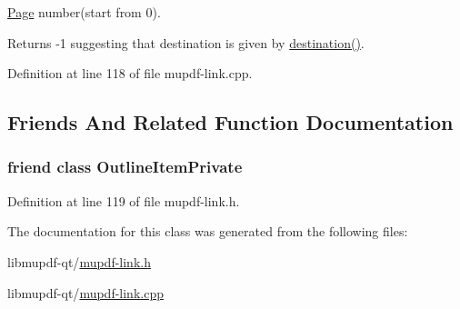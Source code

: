 \hyperlink{class_mu_p_d_f_1_1_page}{Page} number(start from 0). 

\begin{DoxyReturn}{Returns}
-\/1 suggesting that destination is given by \hyperlink{class_mu_p_d_f_1_1_link_goto_r_ab5ff953c35930b5ff57740decee8c61b}{destination()}. 
\end{DoxyReturn}


Definition at line 118 of file mupdf-\/link.\-cpp.



\subsection{Friends And Related Function Documentation}
\hypertarget{class_mu_p_d_f_1_1_link_goto_r_ab008ed670017e41b6e6bba8707c775d2}{
\subsubsection[{Outline\-Item\-Private}]{\setlength{\rightskip}{0pt plus 5cm}friend class Outline\-Item\-Private\hspace{0.3cm}{\ttfamily [friend]}}}\label{class_mu_p_d_f_1_1_link_goto_r_ab008ed670017e41b6e6bba8707c775d2}


Definition at line 119 of file mupdf-\/link.\-h.



The documentation for this class was generated from the following files\-:\begin{DoxyCompactItemize}
\item 
libmupdf-\/qt/\hyperlink{mupdf-link_8h}{mupdf-\/link.\-h}\item 
libmupdf-\/qt/\hyperlink{mupdf-link_8cpp}{mupdf-\/link.\-cpp}\end{DoxyCompactItemize}
